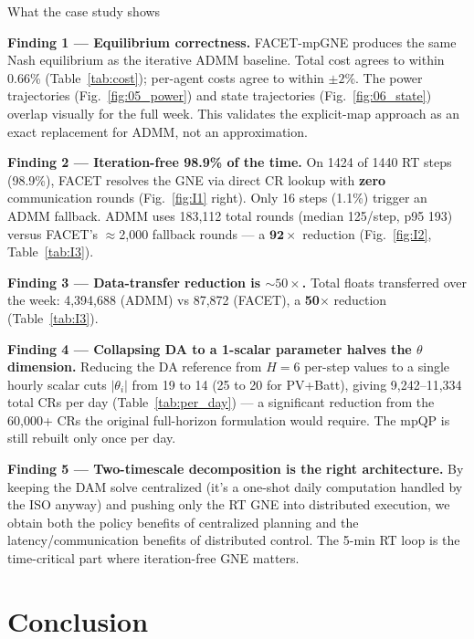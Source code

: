 \documentclass[11pt, letterpaper]{article}
\begin{document}
\begin{findingbox}{What the case study shows}

\textbf{Finding 1 — Equilibrium correctness.}
FACET-mpGNE produces the same Nash equilibrium as the iterative ADMM baseline. Total cost agrees to within 0.66\% (Table~\ref{tab:cost}); per-agent costs agree to within $\pm 2\%$. The power trajectories (Fig.~\ref{fig:05_power}) and state trajectories (Fig.~\ref{fig:06_state}) overlap visually for the full week. This validates the explicit-map approach as an exact replacement for ADMM, not an approximation.

\textbf{Finding 2 — Iteration-free 98.9\% of the time.}
On 1424 of 1440 RT steps (98.9\%), FACET resolves the GNE via direct CR lookup with \textbf{zero} communication rounds (Fig.~\ref{fig:I1} right). Only 16 steps (1.1\%) trigger an ADMM fallback. ADMM uses 183{,}112 total rounds (median 125/step, p95 193) versus FACET's $\approx$2{,}000 fallback rounds — a $\mathbf{92\times}$ reduction (Fig.~\ref{fig:I2}, Table~\ref{tab:I3}).

\textbf{Finding 3 — Data-transfer reduction is $\sim 50\times$.}
Total floats transferred over the week: 4{,}394{,}688 (ADMM) vs 87{,}872 (FACET), a \textbf{50$\times$} reduction (Table~\ref{tab:I3}).

\textbf{Finding 4 — Collapsing DA to a 1-scalar parameter halves the $\theta$ dimension.}
Reducing the DA reference from $H=6$ per-step values to a single hourly scalar cuts $|\theta_i|$ from 19 to 14 (25 to 20 for PV+Batt), giving 9{,}242–11{,}334 total CRs per day (Table~\ref{tab:per_day}) — a significant reduction from the 60{,}000+ CRs the original full-horizon formulation would require. The mpQP is still rebuilt only once per day.

\textbf{Finding 5 — Two-timescale decomposition is the right architecture.}
By keeping the DAM solve centralized (it's a one-shot daily computation handled by the ISO anyway) and pushing only the RT GNE into distributed execution, we obtain both the policy benefits of centralized planning and the latency/communication benefits of distributed control. The 5-min RT loop is the time-critical part where iteration-free GNE matters.

\end{findingbox}

\section{Conclusion}
\end{document}
